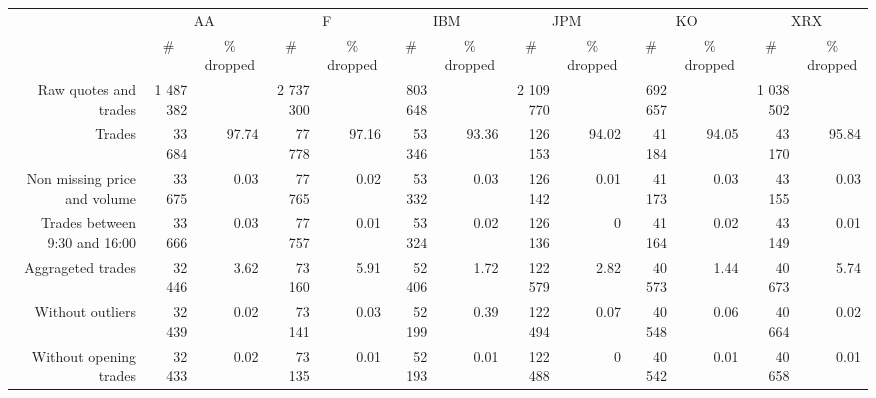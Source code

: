 \begin{tabular}{rrrrrrrrrrrrr} \toprule 
 & \multicolumn{2}{c}{AA}& \multicolumn{2}{c}{F}& \multicolumn{2}{c}{IBM}& \multicolumn{2}{c}{JPM}& \multicolumn{2}{c}{KO}& \multicolumn{2}{c}{XRX} \\ 
\cmidrule(r){2-3} \cmidrule(r){4-5} \cmidrule(r){6-7} \cmidrule(r){8-9} \cmidrule(r){10-11} \cmidrule(r){12-13} &  \multicolumn{1}{c}{$ \# $}&  \multicolumn{1}{c}{$ \% $ dropped}&  \multicolumn{1}{c}{$ \# $}&  \multicolumn{1}{c}{$ \% $ dropped}&  \multicolumn{1}{c}{$ \# $}&  \multicolumn{1}{c}{$ \% $ dropped}&  \multicolumn{1}{c}{$ \# $}&  \multicolumn{1}{c}{$ \% $ dropped}&  \multicolumn{1}{c}{$ \# $}&  \multicolumn{1}{c}{$ \% $ dropped}&  \multicolumn{1}{c}{$ \# $}&  \multicolumn{1}{c}{$ \% $ dropped} \\ \midrule 
 Raw quotes and trades&1 487 382& &2 737 300& & 803 648& &2 109 770& & 692 657& &1 038 502&  \\ 
Trades&33 684&97.74&77 778&97.16&53 346&93.36& 126 153&94.02&41 184&94.05&43 170&95.84 \\ 
Non missing price and volume&33 675&0.03&77 765&0.02&53 332&0.03& 126 142&0.01&41 173&0.03&43 155&0.03 \\ 
Trades between 9:30 and 16:00&33 666&0.03&77 757&0.01&53 324&0.02& 126 136&0&41 164&0.02&43 149&0.01 \\ 
Aggrageted trades&32 446&3.62&73 160&5.91&52 406&1.72& 122 579&2.82&40 573&1.44&40 673&5.74 \\ 
Without outliers&32 439&0.02&73 141&0.03&52 199&0.39& 122 494&0.07&40 548&0.06&40 664&0.02 \\ 
Without opening trades&32 433&0.02&73 135&0.01&52 193&0.01& 122 488&0&40 542&0.01&40 658&0.01 \\ \bottomrule 
\end{tabular}
